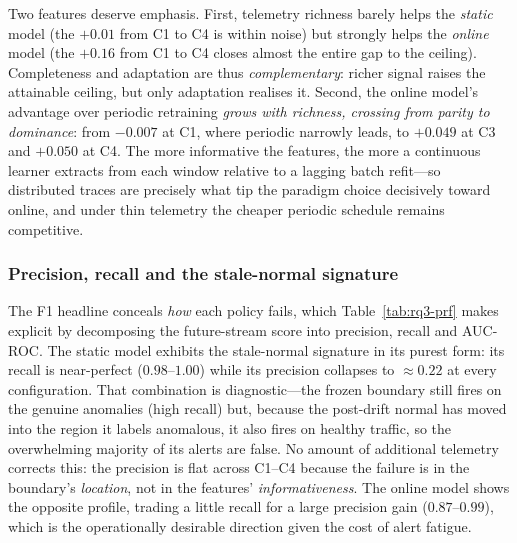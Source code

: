 \documentclass[pdflatex,sn-mathphys-num]{sn-jnl}%
\theoremstyle{thmstyleone}%
\theoremstyle{thmstyletwo}%
\theoremstyle{thmstylethree}%
\begin{document}
Two features deserve emphasis. First, telemetry richness barely helps the \emph{static} model (the $+0.01$ from C1 to C4 is within noise) but strongly helps the \emph{online} model (the $+0.16$ from C1 to C4 closes almost the entire gap to the ceiling). Completeness and adaptation are thus \emph{complementary}: richer signal raises the attainable ceiling, but only adaptation realises it. Second, the online model's advantage over periodic retraining \emph{grows with richness, crossing from parity to dominance}: from $-0.007$ at C1, where periodic narrowly leads, to $+0.049$ at C3 and $+0.050$ at C4. The more informative the features, the more a continuous learner extracts from each window relative to a lagging batch refit---so distributed traces are precisely what tip the paradigm choice decisively toward online, and under thin telemetry the cheaper periodic schedule remains competitive.

\subsubsection{Precision, recall and the stale-normal signature}\label{sec:res-rq3-prf}

The F1 headline conceals \emph{how} each policy fails, which Table~\ref{tab:rq3-prf} makes explicit by decomposing the future-stream score into precision, recall and AUC-ROC. The static model exhibits the stale-normal signature in its purest form: its recall is near-perfect ($0.98$--$1.00$) while its precision collapses to $\approx 0.22$ at every configuration. That combination is diagnostic---the frozen boundary still fires on the genuine anomalies (high recall) but, because the post-drift normal has moved into the region it labels anomalous, it also fires on healthy traffic, so the overwhelming majority of its alerts are false. No amount of additional telemetry corrects this: the precision is flat across C1--C4 because the failure is in the boundary's \emph{location}, not in the features' \emph{informativeness}. The online model shows the opposite profile, trading a little recall for a large precision gain ($0.87$--$0.99$), which is the operationally desirable direction given the cost of alert fatigue.
\end{document}
